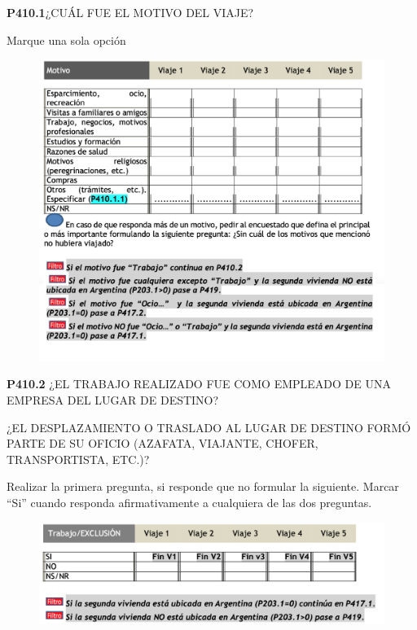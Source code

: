 \documentclass[
  openany]{book}
\begin{document}
\textbf{P410.1}¿CUÁL FUE EL MOTIVO DEL VIAJE?

Marque una sola opción

\begin{figure}

{\centering \includegraphics[width=1\linewidth]{imagenes/figura6-182} 

}

\end{figure}

\textbf{P410.2} ¿EL TRABAJO REALIZADO FUE COMO EMPLEADO DE UNA EMPRESA DEL LUGAR DE DESTINO?

¿EL DESPLAZAMIENTO O TRASLADO AL LUGAR DE DESTINO FORMÓ PARTE DE SU OFICIO (AZAFATA, VIAJANTE, CHOFER, TRANSPORTISTA, ETC.)?

Realizar la primera pregunta, si responde que no formular la siguiente. Marcar ``Si'' cuando responda afirmativamente a cualquiera de las dos preguntas.

\begin{figure}

{\centering \includegraphics[width=1\linewidth]{imagenes/figura6-183} 

}

\end{figure}
\end{document}
